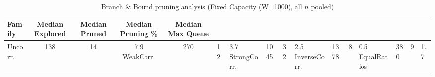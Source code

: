 \begin{table}[tb]
\centering
\caption{Branch $\&$ Bound pruning analysis (Fixed Capacity (W=1000), all $n$ pooled)}
\label{tab:fixed-bb-pruning}
\begin{tabular}{lcccc}
\toprule
Family & Median Explored & Median Pruned & Median Pruning \% & Median Max Queue \\
\midrule
Uncorr. & 138 & 14 & 7.9%
WeakCorr. & 270 & 12 & 3.7%
StrongCorr. & 1045 & 32 & 2.5%
InverseCorr. & 1378 & 8 & 0.5%
EqualRatios & 380 & 9 & 1.7%
\bottomrule
\end{tabular}
\end{table}

